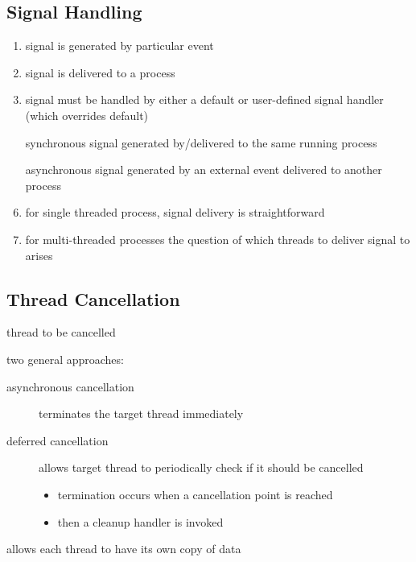 \documentclass[11pt]{article}
\begin{document}
\subsection{Signal Handling}
\label{sec:org73fe777}
\begin{enumerate}
\item signal is generated by particular event
\item signal is delivered to a process
\item signal must be handled by either a default or user-defined signal handler (which overrides default)

\item[{synchronous signal}] generated by/delivered to the same running process
\item[{asynchronous signal}] generated by an external event delivered to another process
\item for single threaded process, signal delivery is straightforward
\item for multi-threaded processes the question of which threads to deliver signal to arises
\end{enumerate}
\subsection{Thread Cancellation}
\label{sec:org2ef7e88}
\begin{description}
\item[{target thread}] thread to be cancelled
\item two general approaches:
\begin{description}
\item[{asynchronous cancellation}] terminates the target thread immediately
\item[{deferred cancellation}] allows target thread to periodically check if it should be cancelled
\begin{itemize}
\item termination occurs when a cancellation point is reached
\item then a cleanup handler is invoked
\end{itemize}
\end{description}
\item[{Thread-local storage}] allows each thread to have its own copy of data
\end{description}
\end{document}
